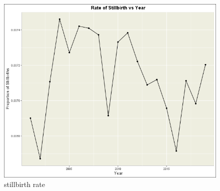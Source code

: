 \begin{figure}
  \centering
  \includegraphics[width=.5\textwidth]{img/aus/kanishka/stillbirth_year.png}
  \caption{stillbirth rate}
  \label{fig:still-rate}
\end{figure}


